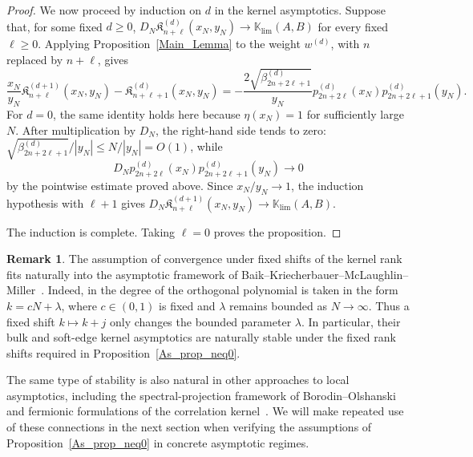 \documentclass[reqno,11pt]{amsart}
\theoremstyle{plain}
\theoremstyle{definition}
\newtheorem{remark}[thm]{Remark}
\numberwithin{equation}{section}
\begin{document}
\begin{proof}
We now proceed by induction on $d$ in the kernel asymptotics. Suppose that, for some fixed $d\geq0$,
$D_N\mathfrak K_{n+\ell}^{(d)}(x_N,y_N)\to
\mathbb K_{\lim}(A,B)$ for every fixed $\ell\geq0$.
Applying Proposition~\ref{Main_Lemma} to the weight $w^{(d)}$, with
$n$ replaced by $n+\ell$, gives
\[
\frac{x_N}{y_N}
\mathfrak K_{n+\ell}^{(d+1)}(x_N,y_N)
-
\mathfrak K_{n+\ell+1}^{(d)}(x_N,y_N)
=
-\frac{
2\sqrt{\beta_{2n+2\ell+1}^{(d)}}
}{
y_N
}
p_{2n+2\ell}^{(d)}(x_N)
p_{2n+2\ell+1}^{(d)}(y_N).
\]
For $d=0$, the same identity holds here because
$\eta(x_N)=1$ for sufficiently large $N$.
After multiplication by $D_N$, the right-hand side tends to zero:
$\sqrt{\beta_{2n+2\ell+1}^{(d)}}/|y_N|\leq N/|y_N|=O(1)$, while
\[
D_N
p_{2n+2\ell}^{(d)}(x_N)
p_{2n+2\ell+1}^{(d)}(y_N)
\longrightarrow0
\]
by the pointwise estimate proved above. Since $x_N/y_N\to1$, the
induction hypothesis with $\ell+1$ gives
$D_N\mathfrak K_{n+\ell}^{(d+1)}(x_N,y_N)\to
\mathbb K_{\lim}(A,B)$.

The induction is complete. Taking $\ell=0$ proves the proposition.
\end{proof}

\begin{remark}\label{rem:fixed_shift}
The assumption of convergence under fixed shifts of the kernel rank
fits naturally into the asymptotic framework of
Baik--Kriecherbauer--McLaughlin--Miller~\cite{baik2007discrete}.
Indeed, in \cite[\S1.3.1]{baik2007discrete} the degree of the
orthogonal polynomial is taken in the form $k=cN+\lambda$, where
$c\in(0,1)$ is fixed and $\lambda$ remains bounded as $N\to\infty$.
Thus a fixed shift $k\mapsto k+j$ only changes the bounded parameter
$\lambda$. In particular, their bulk and soft-edge kernel asymptotics
are naturally stable under the fixed rank shifts required in
Proposition~\ref{As_prop_neq0}.

The same type of stability is also natural in other approaches to
local asymptotics, including the spectral-projection framework of
Borodin--Olshanski~\cite{borodin2007asymptotics, Borodin_2017} and fermionic formulations of the correlation
kernel~\cite{Okounkov01}. We will make repeated use of these connections in the next
section when verifying the assumptions of
Proposition~\ref{As_prop_neq0} in concrete asymptotic regimes.
\end{remark}
\end{document}
